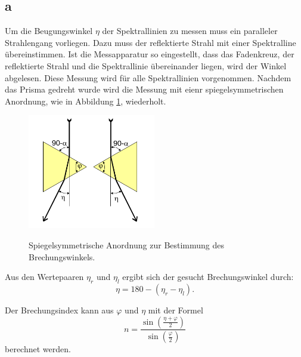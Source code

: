 \subsection{a}%
Um die Beugungswinkel $\eta$ der Spektrallinien zu messen muss ein
paralleler Strahlengang vorliegen. Dazu muss der reflektierte
Strahl mit einer Spektralline übereinstimmen. Ist die Messapparatur
so eingestellt, dass das Fadenkreuz, der reflektierte Strahl und die
Spektrallinie übereinander liegen, wird der Winkel abgelesen.
Diese Messung wird für alle Spektrallinien vorgenommen.
Nachdem das Prisma gedreht wurde wird die Messung mit eienr
spiegelsymmetrischen Anordnung, wie in Abbildung
\ref{fig:spiegel}, wiederholt.

\begin{figure}[H]
  \centering
  \includegraphics[height=5cm]{spiegel.png}
  \caption{Spiegelsymmetrische Anordnung zur Bestimmung des Brechungswinkels.}
  \label{fig:spiegel}
  \cite{skript}
\end{figure}

Aus den Wertepaaren $\eta_r$ und $\eta_l$ ergibt sich der gesucht
Brechungswinkel durch:
\begin{equation}
  \eta=180-(\eta_r - \eta_l).
  \label{eqn:eta}
\end{equation}

Der Brechungsindex kann aus $\varphi$ und $\eta$ mit der Formel
\begin{equation}
  n=\frac{\sin{(\frac{\eta+\varphi}{2})}}{\sin{(\frac{\varphi}{2})}}
  \label{brechungsindex}
\end{equation}
berechnet werden.
